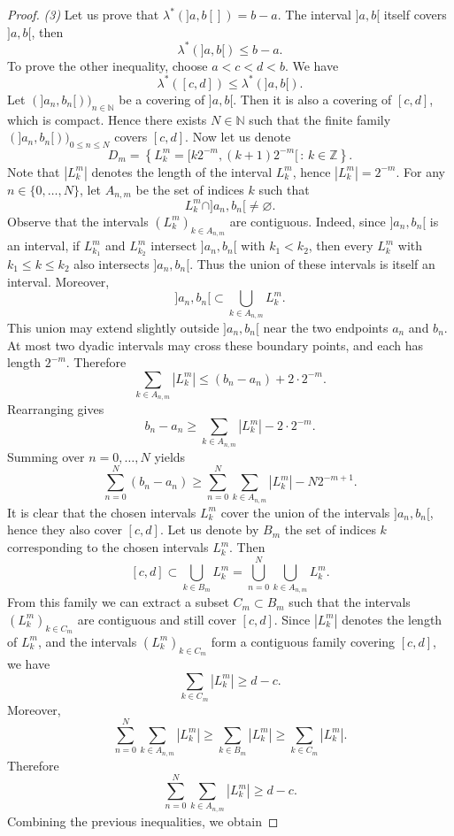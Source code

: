 \begin{proof}
		\emph{(3)} Let us prove that $\lambda^*(]a,b[]) = b-a$.
		The interval $]a,b[$ itself covers $]a,b[$, then
		\[
			\lambda^*(]a,b[)\le b-a.
		\]
		To prove the other inequality, choose $a<c<d<b$. We have
		\[
			\lambda^*([c,d])\le \lambda^*(]a,b[).
		\]
		Let $(]a_n,b_n[))_{n\in\mathbb{N}}$ be a covering of $]a,b[$. Then it is also a covering of $[c,d]$, which is compact. Hence there exists $N\in\mathbb{N}$ such that the finite family $(]a_n,b_n[))_{0\le n\le N}$ covers $[c,d]$.
		Now let us denote
		\[
			D_m=\left\{L_k^m=[k2^{-m},(k+1)2^{-m}[\,:\,k\in\mathbb{Z}\right\}.
		\]
		Note that $|L_k^m|$ denotes the length of the interval $L_k^m$, hence
	$|L_k^m|=2^{-m}$.
		For any $n\in\{0,\dots,N\}$, let $A_{n,m}$ be the set of indices $k$
		such that
		\[
			L_k^m\cap ]a_n,b_n[\neq\varnothing .
		\]
		Observe that the intervals $(L_k^m)_{k\in A_{n,m}}$ are contiguous.
		Indeed, since $]a_n,b_n[$ is an interval, if $L_{k_1}^m$ and
	$L_{k_2}^m$ intersect $]a_n,b_n[$ with $k_1<k_2$, then every
	$L_k^m$ with $k_1\le k\le k_2$ also intersects $]a_n,b_n[$.
		Thus the union of these intervals is itself an interval.
		Moreover,
		\[
			]a_n,b_n[
			\subset
			\bigcup_{k\in A_{n,m}} L_k^m .
		\]
		This union may extend slightly outside $]a_n,b_n[$ near the two
		endpoints $a_n$ and $b_n$. At most two dyadic intervals may cross these
		boundary points, and each has length $2^{-m}$. Therefore
		\[
			\sum_{k\in A_{n,m}} |L_k^m|
			\le
			(b_n-a_n)+2\cdot 2^{-m}.
		\]
		Rearranging gives
		\[
			b_n-a_n
			\ge
			\sum_{k\in A_{n,m}} |L_k^m| - 2\cdot 2^{-m}.
		\]
		Summing over $n=0,\dots,N$ yields
		\[
			\sum_{n=0}^{N}(b_n-a_n)
			\ge
			\sum_{n=0}^{N}\sum_{k\in A_{n,m}} |L_k^m| - N2^{-m+1}.
		\]
		It is clear that the chosen intervals $L_k^m$ cover the union of the
		intervals $]a_n,b_n[$, hence they also cover $[c,d]$.
		Let us denote by $B_m$ the set of indices $k$ corresponding to the chosen
		intervals $L_k^m$. Then
		\[
			[c,d] \subset \bigcup_{k\in B_m} L_k^m
			= \bigcup_{n=0}^{N} \bigcup_{k \in A_{n,m}} L_k^m .
		\]
		From this family we can extract a subset $C_m\subset B_m$ such that the
		intervals $(L_k^m)_{k\in C_m}$ are contiguous and still cover $[c,d]$.
		Since $|L_k^m|$ denotes the length of $L_k^m$, and the intervals
	$(L_k^m)_{k\in C_m}$ form a contiguous family covering $[c,d]$, we have
		\[
			\sum_{k\in C_m} |L_k^m| \ge d-c.
		\]
		Moreover,
		\[
			\sum_{n=0}^{N}\sum_{k\in A_{n,m}} |L_k^m|
			\ge
			\sum_{k\in B_m} |L_k^m|
			\ge
			\sum_{k\in C_m} |L_k^m|.
		\]
		Therefore
		\[
			\sum_{n=0}^{N}\sum_{k\in A_{n,m}} |L_k^m|
			\ge d-c.
		\]
		Combining the previous inequalities, we obtain

\end{proof}
